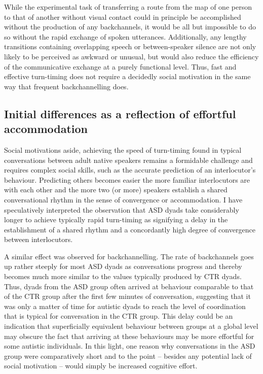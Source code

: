 While the experimental task of transferring a route from the map of one person to that of another without visual contact could in principle be accomplished without the production of any backchannels, it would be all but impossible to do so without the rapid exchange of spoken utterances. Additionally, any lengthy transitions containing overlapping speech or between-speaker silence are not only likely to be perceived as awkward or unusual, but would also reduce the efficiency of the communicative exchange at a purely functional level. Thus, fast and effective turn-timing does not require a decidedly social motivation in the same way that frequent backchannelling does.

\subsection{Initial differences as a reflection of effortful accommodation}\label{Conclusion_discussion_stages}

Social motivations aside, achieving the speed of turn-timing found in typical conversations between adult native speakers remains a formidable challenge and requires complex social skills, such as the accurate prediction of an interlocutor's behaviour. Predicting others becomes easier the more familiar interlocutors are with each other and the more two (or more) speakers establish a shared conversational rhythm in the sense of convergence or accommodation. I have  speculatively interpreted the observation that ASD dyads take considerably longer to achieve typically rapid turn-timing as signifying a delay in the establishment of a shared rhythm and a concordantly high degree of convergence between interlocutors.

A similar effect was observed for backchannelling. The rate of backchannels goes up rather steeply for most ASD dyads as conversations progress and thereby becomes much more similar to the values typically produced by CTR dyads. Thus, dyads from the ASD group often arrived at behaviour comparable to that of the CTR group after the first few minutes of conversation, suggesting that it was only a matter of time for autistic dyads to reach the level of coordination that is typical for conversation in the CTR group. This delay could be an indication that superficially equivalent behaviour between groups at a global level may obscure the fact that arriving at these behaviours may be more effortful for some autistic individuals. In this light, one reason why conversations in the ASD group were comparatively short and to the point -- besides any potential lack of social motivation -- would simply be increased cognitive effort.

